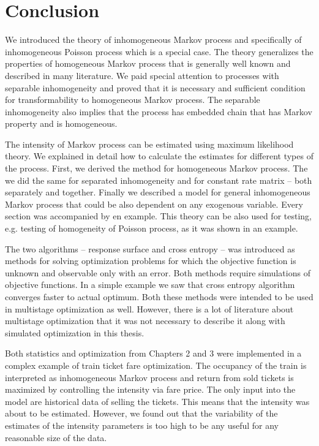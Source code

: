 \chapter*{Conclusion}
	\label{chap:conclusion}

We introduced the theory of inhomogeneous Markov process and specifically of inhomogeneous Poisson process which is a special case.
The theory generalizes the properties of homogeneous Markov process that is generally well known and described in many literature.
We paid special attention to processes with separable inhomogeneity and proved that it is necessary and sufficient condition for transformability to homogeneous Markov process. The separable inhomogeneity also implies that the process has embedded chain that has Markov property and is homogeneous.

The intensity of Markov process can be estimated using maximum likelihood theory.
We explained in detail how to calculate the estimates for different types of the process.
First, we derived the method for homogeneous Markov process.
The we did the same for separated inhomogeneity and for constant rate matrix -- both separately and together.
Finally we described a model for general inhomogeneous Markov process that could be also dependent on any exogenous variable.
Every section was accompanied by en example.
This theory can be also used for testing, e.g. testing of homogeneity of Poisson process, as it was shown in an example.

The two algorithms -- response surface and cross entropy -- was introduced as methods for solving optimization problems for which the objective function is unknown and observable only with an error.
Both methods require simulations of objective functions.
In a simple example we saw that cross entropy algorithm converges faster to actual optimum.
Both these methods were intended to be used in multistage optimization as well.
However, there is a lot of literature about multistage optimization that it was not necessary to describe it along with simulated optimization in this thesis.

Both statistics and optimization from Chapters 2 and 3 were implemented in a complex example of train ticket fare optimization.
The occupancy of the train is interpreted as inhomogeneous Markov process and return from sold tickets is maximized by controlling the intensity via fare price.
The only input into the model are historical data of selling the tickets.
This means that the intensity was about to be estimated.
However, we found out that the variability of the estimates of the intensity parameters is too high to be any useful for any reasonable size of the data.

